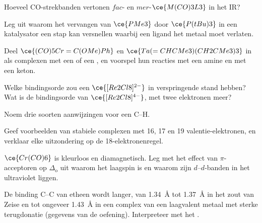 \begin{exercise}[$\star\star$]\label{exo:b3:organometallic-bonding:5}
Hoeveel CO-strekbanden vertonen $fac$- en $mer$-$\ce{M(CO)3L3}$ in het IR?
\end{exercise}

\begin{exercise}[$\star\star$]\label{exo:b3:organometallic-bonding:6}
Leg uit waarom het vervangen van $\ce{PMe3}$ door $\ce{P(tBu)3}$ in een katalysator een stap kan versnellen waarbij een
ligand het metaal moet verlaten.
\end{exercise}

\begin{exercise}[$\star\star$]\label{exo:b3:organometallic-bonding:7}
Deel $\ce{(CO)5Cr=C(OMe)Ph}$ en $\ce{Ta(=CHCMe3)(CH2CMe3)3}$ in als complexen met een  of
een , en voorspel hun reacties met een amine en met een
keton.
\end{exercise}

\begin{exercise}[$\star\star$]\label{exo:b3:organometallic-bonding:8}
Welke bindingsorde zou een $\ce{[Re2Cl8]^{2-}}$ in verspringende stand hebben? Wat is de bindingsorde van
$\ce{[Re2Cl8]^{4-}}$, met twee elektronen meer?
\end{exercise}

\begin{exercise}[$\star\star$]\label{exo:b3:organometallic-bonding:9}
Noem drie soorten aanwijzingen voor een  C--H.
\end{exercise}

\begin{exercise}[$\star\star\star$]\label{exo:b3:organometallic-bonding:10}
Geef voorbeelden van stabiele complexen met 16, 17 en 19
valentie-elektronen, en verklaar elke uitzondering op de
18-elektronenregel.
\end{exercise}

\begin{exercise}[$\star\star\star$]\label{exo:b3:organometallic-bonding:11}
$\ce{Cr(CO)6}$ is kleurloos en diamagnetisch. Leg met het effect van $\pi$-acceptoren op $\Delta_{\mathrm o}$ uit
waarom het laagspin is en waarom zijn $d$--$d$-banden in het ultraviolet liggen.
\end{exercise}

\begin{exercise}[$\star\star\star$]\label{exo:b3:organometallic-bonding:12}
De binding C--C van etheen wordt langer, van \qty{1.34}{\angstrom} tot \qty{1.37}{\angstrom} in het zout van Zeise en tot
ongeveer \qty{1.43}{\angstrom} in een complex van een laagvalent metaal met sterke terugdonatie (gegevens van de
oefening). Interpreteer met het .
\end{exercise}

